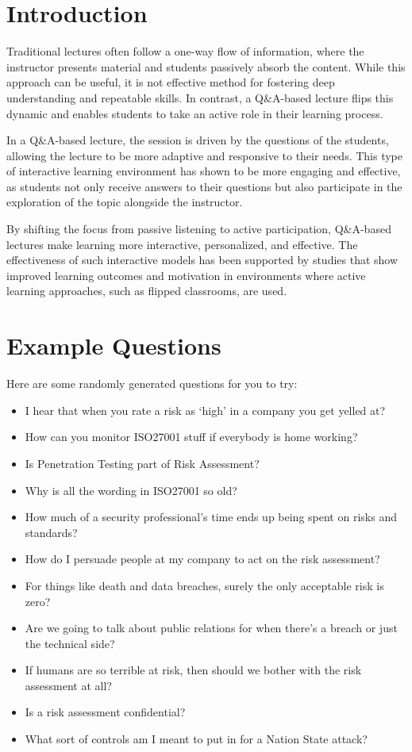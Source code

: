 \documentclass[12pt]{article}
\begin{document}
\section*{Introduction}

Traditional lectures often follow a one-way flow of information, where the instructor presents material and students passively absorb the content. 
While this approach can be useful, it is not effective method for fostering deep understanding and repeatable skills. In contrast, a Q\&A-based lecture flips this dynamic and enables students to take an active role in their learning process.\cite{reidsema2017flipped} 

In a Q\&A-based lecture, the session is driven by the questions of the students, allowing the lecture to be more adaptive and responsive to their needs. This type of interactive learning environment has shown to be more engaging and effective, as students not only receive answers to their questions but also participate in the exploration of the topic alongside the instructor.\cite{ZhengLanqin2020TEot} 

By shifting the focus from passive listening to active participation, Q\&A-based lectures make learning more interactive, personalized, and effective. The effectiveness of such interactive models has been supported by studies that show improved learning outcomes and motivation in environments where active learning approaches, such as flipped classrooms, are used.\cite{ZhengLanqin2020TEot}

\section{Example Questions} 
Here are some randomly generated questions for you to try: 

\begin{itemize}
  \item I hear that when you rate a risk as `high' in a company you get yelled at?
  \item How can you monitor ISO27001 stuff if everybody is home working?
  \item Is Penetration Testing part of Risk Assessment?
  \item Why is all the wording in ISO27001 so old?
  \item How much of a security professional's time ends up being spent on risks and standards?
  \item How do I persuade people at my company to act on the risk assessment?
  \item For things like death and data breaches, surely the only acceptable risk is zero?
  \item Are we going to talk about public relations for when there's a breach or just the technical side?
  \item If humans are so terrible at risk, then should we bother with the risk assessment at all?
  \item Is a risk assessment confidential?
  \item What sort of controls am I meant to put in for a Nation State attack?
\end{itemize}
\end{document}
